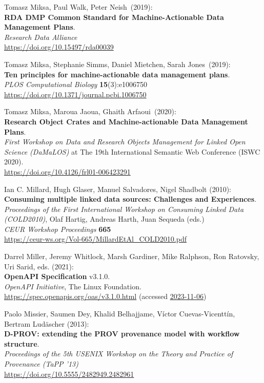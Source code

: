\begin{thebibliography}{9}
Tomasz Miksa, Paul Walk, Peter Neish~(2019):\\
\textbf{RDA DMP Common Standard for Machine-Actionable Data Management
Plans}.\\
\emph{Research Data Alliance}\\
\url{https://doi.org/10.15497/rda00039}

Tomasz Miksa, Stephanie Simms, Daniel Mietchen, Sarah Jones~(2019):\\
\textbf{Ten principles for machine-actionable data management plans}.\\
\emph{PLOS Computational Biology} \textbf{15}(3):e1006750\\
\url{https://doi.org/10.1371/journal.pcbi.1006750}

Tomasz Miksa, Maroua Jaoua, Ghaith Arfaoui~(2020):\\
\textbf{Research Object Crates and Machine-actionable Data Management
Plans}.\\
\emph{First Workshop on Data and Research Objects Management for Linked
Open Science (DaMaLOS)} at The 19th International Semantic Web
Conference (ISWC 2020).\\
\url{https://doi.org/10.4126/frl01-006423291}

Ian C. Millard, Hugh Glaser, Manuel Salvadores, Nigel Shadbolt (2010):\\
\textbf{Consuming multiple linked data sources: Challenges and Experiences}.\\
\emph{Proceedings of the First International Workshop on Consuming Linked Data (COLD2010)}, 
Olaf Hartig, Andreas Harth, Juan Sequeda (eds.) \\
\emph{CEUR Workshop Proceedings} \textbf{665}\\
\url{https://ceur-ws.org/Vol-665/MillardEtAl_COLD2010.pdf}

Darrel Miller, Jeremy Whitlock, Marsh Gardiner, Mike Ralphson, Ron
Ratovsky, Uri Sarid, eds. (2021): \\
\textbf{OpenAPI Specification} v3.1.0.\\
\emph{OpenAPI Initiative}, The Linux Foundation.\\
\url{https://spec.openapis.org/oas/v3.1.0.html} 
(accessed \href{https://web.archive.org/web/20231106014946/https://spec.openapis.org/oas/v3.1.0.html}{2023-11-06})

Paolo Missier, Saumen Dey, Khalid Belhajjame, Víctor Cuevas-Vicenttín, Bertram Ludäscher (2013):\\
\textbf{D-PROV: extending the PROV provenance model with workflow structure}.\\
\emph{Proceedings of the 5th USENIX Workshop on the Theory and Practice of Provenance (TaPP '13)}\\
\url{https://doi.org/10.5555/2482949.2482961}


\end{thebibliography}
